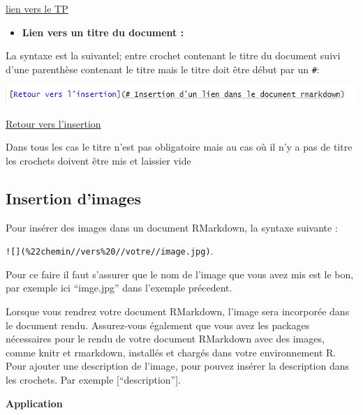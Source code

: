 \documentclass[
  12pt,
]{article}
\providecommand{\tightlist}{%
  \setlength{\itemsep}{0pt}\setlength{\parskip}{0pt}}
\begin{document}
\href{C:/Users/Larry/Desktop/ISE\%201/S2/Projet\%20Statistique\%20avec\%20R/Projet\%20R\%20Markdown/Plan_de_travail_R_Markdown\%5B1\%5D.docx}{lien
vers le TP}

\begin{itemize}
\tightlist
\item
  \textbf{Lien vers un titre du document :}
\end{itemize}

La syntaxe est la suivantel; entre crochet contenant le titre du
document suivi d'une parenthèse contenant le titre mais le titre doit
être début par un \texttt{\#}:

\begin{center}\includegraphics[width=0.7\linewidth,height=0.7\textheight]{../Document_Rmarkdown/Images/Lien_vers_titre} \end{center}

\hyperref[ux5cux2520Insertionux5cux2520dux27unux5cux2520lienux5cux2520dansux5cux2520leux5cux2520documentux5cux2520rmarkdown]{Retour
vers l'insertion}

Dans tous les cas le titre n'est pas obligatoire mais au cas où il n'y a
pas de titre les crochets doivent être mis et laissier vide

\subsection{Insertion d'images}\label{insertion-dimages}

Pour insérer des images dans un document RMarkdown, la syntaxe suivante
:

\texttt{!{[}{]}(\%22chemin//vers\%20//votre//image.jpg)}.

Pour ce faire il faut s'assurer que le nom de l'image que vous avez mis
est le bon, par exemple ici ``imge.jpg'' dans l'exemple précedent.

Lorsque vous rendrez votre document RMarkdown, l'image sera incorporée
dans le document rendu. Assurez-vous également que vous avez les
packages nécessaires pour le rendu de votre document RMarkdown avec des
images, comme knitr et rmarkdown, installés et chargés dans votre
environnement R.\\
Pour ajouter une description de l'image, pour pouvez insérer la
description dans les crochets. Par exemple {[}``description''{]}.

\textbf{Application}
\end{document}
